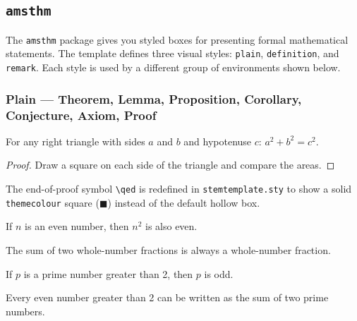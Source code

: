 	\subsection{\texttt{amsthm}}
	The \texttt{amsthm} package gives you styled boxes for presenting formal mathematical statements. The template defines three visual styles: \texttt{plain}, \texttt{definition}, and \texttt{remark}. Each style is used by a different group of environments shown below.
	
		\subsubsection{Plain --- Theorem, Lemma, Proposition, Corollary, Conjecture, Axiom, Proof}
		
		\begin{theorem}
			\label{thm:pythagorean}
			For any right triangle with sides $a$ and $b$ and hypotenuse $c$:
			$a^2 + b^2 = c^2$.
		\end{theorem}
		
		\begin{proof}
			Draw a square on each side of the triangle and compare the areas.
		\end{proof}
		
		The end-of-proof symbol \texttt{\textbackslash qed} is redefined in \texttt{stemtemplate.sty} to show a solid \texttt{themecolour} square (\textcolor{themecolour}{$\blacksquare$}) instead of the default hollow box.
		
		\begin{lemma}
			\label{lem:even}
			If $n$ is an even number, then $n^2$ is also even.
		\end{lemma}
		
		\begin{proposition}
			\label{prop:rational}
			The sum of two whole-number fractions is always a whole-number fraction.
		\end{proposition}
		
		\begin{corollary}
			\label{cor:prime}
			If $p$ is a prime number greater than 2, then $p$ is odd.
		\end{corollary}
		
		\begin{conjecture}
			\label{con:goldbach}
			Every even number greater than 2 can be written as the sum of two prime numbers.
		\end{conjecture}
		
